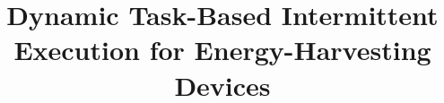 \documentclass[pageno]{jpaper}
\newcommand{\sysfull}{Dynamic Task-Based Intermittent Execution for Energy-Harvesting Devices}
\begin{document}
%
%
\title{\sysfull}         %
\date{}
\maketitle
%
%
%
%
%
%
%
%
%
%
%
\begin{abstract}	

\end{abstract}
%
\end{document}

